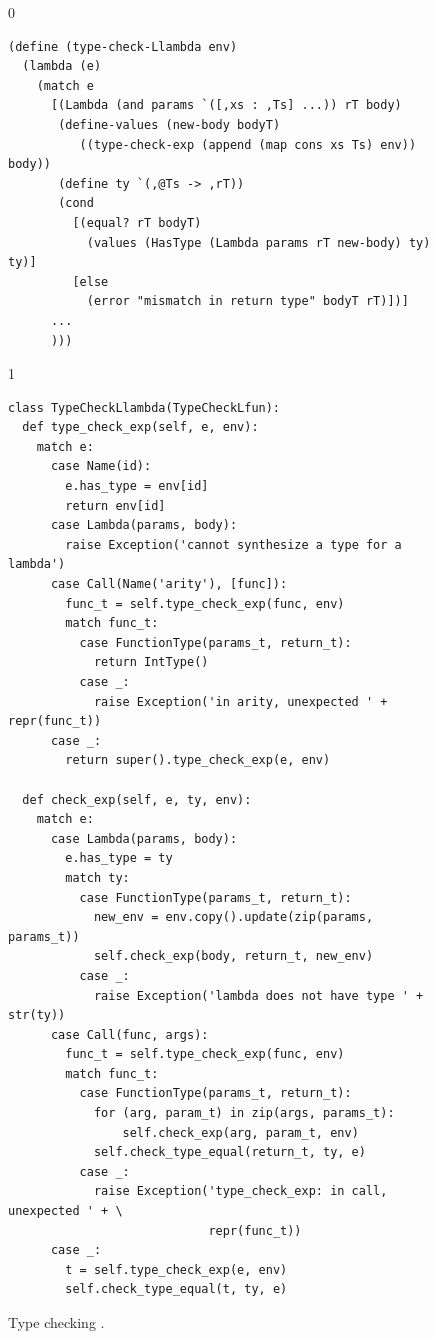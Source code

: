 \documentclass[7x10]{TimesAPriori_MIT}%
\def\racketEd{0}
\def\pythonEd{1}
\def\edition{1}
\newcommand{\pythonColor}[0]{}
\newcommand{\python}[1]{{\if\edition\pythonEd\pythonColor #1\fi}}
\numberwithin{theorem}{chapter}
\numberwithin{definition}{chapter}
\numberwithin{equation}{chapter}
\begin{document}
\begin{figure}[tbp]
  \begin{tcolorbox}[colback=white]
    {\if\edition\racketEd 
\begin{lstlisting}
(define (type-check-Llambda env)
  (lambda (e)
    (match e
      [(Lambda (and params `([,xs : ,Ts] ...)) rT body)
       (define-values (new-body bodyT) 
          ((type-check-exp (append (map cons xs Ts) env)) body))
       (define ty `(,@Ts -> ,rT))
       (cond
         [(equal? rT bodyT)
           (values (HasType (Lambda params rT new-body) ty) ty)]
         [else
           (error "mismatch in return type" bodyT rT)])]
      ...
      )))
\end{lstlisting}
\fi}
{\if\edition\pythonEd\pythonColor 
\begin{lstlisting}
class TypeCheckLlambda(TypeCheckLfun):
  def type_check_exp(self, e, env):
    match e:
      case Name(id):
        e.has_type = env[id]
        return env[id]
      case Lambda(params, body):
        raise Exception('cannot synthesize a type for a lambda')
      case Call(Name('arity'), [func]):
        func_t = self.type_check_exp(func, env)
        match func_t:
          case FunctionType(params_t, return_t):
            return IntType()
          case _:
            raise Exception('in arity, unexpected ' + repr(func_t))
      case _:
        return super().type_check_exp(e, env)
    
  def check_exp(self, e, ty, env):
    match e:
      case Lambda(params, body):
        e.has_type = ty
        match ty:
          case FunctionType(params_t, return_t):
            new_env = env.copy().update(zip(params, params_t))
            self.check_exp(body, return_t, new_env)
          case _:
            raise Exception('lambda does not have type ' + str(ty))
      case Call(func, args):
        func_t = self.type_check_exp(func, env)
        match func_t:
          case FunctionType(params_t, return_t):
            for (arg, param_t) in zip(args, params_t):
                self.check_exp(arg, param_t, env)
            self.check_type_equal(return_t, ty, e)
          case _:
            raise Exception('type_check_exp: in call, unexpected ' + \
                            repr(func_t))
      case _:
        t = self.type_check_exp(e, env)
        self.check_type_equal(t, ty, e)
\end{lstlisting}
\fi}
  \end{tcolorbox}

  \caption{Type checking \LangLam{}\python{, part 1}.}
\label{fig:type-check-Llambda}
\end{figure}
\end{document}

